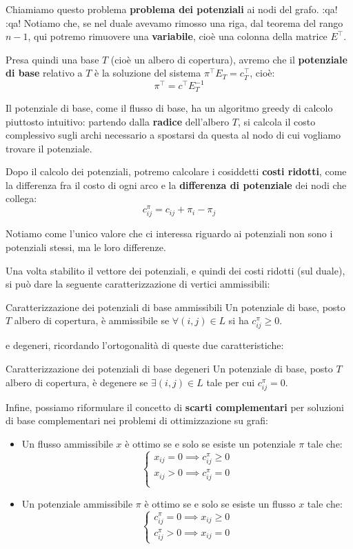 \documentclass[a4paper,11pt]{article}
\begin{document}
Chiamiamo questo problema \textbf{problema dei potenziali} ai nodi del grafo.
:qa!
:qa!
Notiamo che, se nel duale avevamo rimosso una riga, dal teorema del rango $n-1$, qui potremo rimuovere una \textbf{variabile}, cioè una colonna della matrice $E^\intercal$.

Presa quindi una base $T$ (cioè un albero di copertura), avremo che il \textbf{potenziale di base} relativo a $T$ è la soluzione del sistema $ \pi^\intercal E_T =c_T^\intercal $, cioè:
$$
\pi^\intercal = c^\intercal E_T^{-1}
$$

Il potenziale di base, come il flusso di base, ha un algoritmo greedy di calcolo piuttosto intuitivo: partendo dalla \textbf{radice} dell'albero $T$, si calcola il costo complessivo sugli archi necessario a spostarsi da questa al nodo di cui vogliamo trovare il potenziale.

Dopo il calcolo dei potenziali, potremo calcolare i cosiddetti \textbf{costi ridotti}, come la differenza fra il costo di ogni arco e la \textbf{differenza di potenziale} dei nodi che collega:
$$
c^\pi_{ij} = c_{ij} + \pi_i - \pi_j
$$

Notiamo come l'unico valore che ci interessa riguardo ai potenziali non sono i potenziali stessi, ma le loro differenze. 

Una volta stabilito il vettore dei potenziali, e quindi dei costi ridotti (sul duale), si può dare la seguente caratterizzazione di vertici ammissibili:

\begin{definition}{Caratterizzazione dei potenziali di base ammissibili}
	Un potenziale di base, posto $T$ albero di copertura, è ammissibile se $\forall (i, j) \in L$ si ha $c^\pi_{ij} \geq 0$. 
\end{definition}

e degeneri, ricordando l'ortogonalità di queste due caratteristiche:

\begin{definition}{Caratterizzazione dei potenziali di base degeneri}
	Un potenziale di base, posto $T$ albero di copertura, è degenere se $\exists (i, j) \in L$ tale per cui $c^\pi_{ij} = 0$.
\end{definition}

Infine, possiamo riformulare il concetto di \textbf{scarti complementari} per soluzioni di base complementari nei problemi di ottimizzazione su grafi:
\begin{itemize}
	\item Un flusso ammissibile $x$ è ottimo se e solo se esiste un potenziale $\pi$ tale che:
		\[
			\begin{cases}
				x_{ij} = 0 \implies c^\pi_{ij} \geq 0 \\ 	
				x_{ij} > 0 \implies c^\pi_{ij} = 0 \\ 	
			\end{cases}
		\]
	\item Un potenziale ammissibile $\pi$ è ottimo se e solo se esiste un flusso $x$ tale che:
		\[
			\begin{cases}
				c^\pi_{ij} = 0 \implies x_{ij} \geq 0 \\ 
				c^\pi_{ij} > 0 \implies x_{ij} = 0
			\end{cases}
		\]
\end{itemize}
\end{document}
